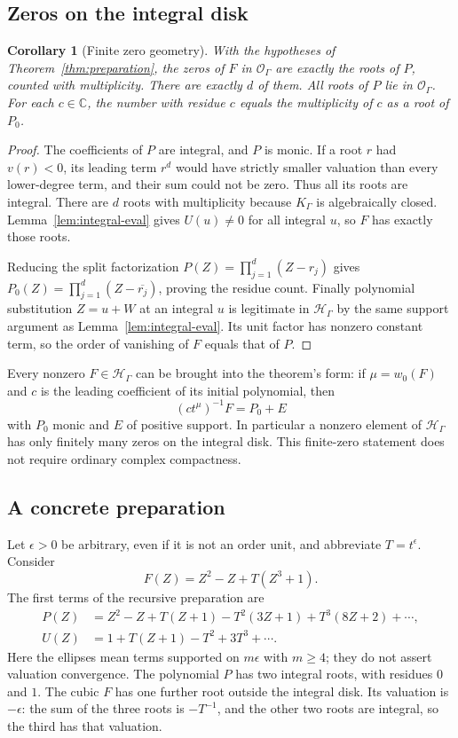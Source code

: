 \documentclass[11pt,letterpaper]{article}
\numberwithin{equation}{section}
\newtheorem{corollary}[theorem]{Corollary}
\theoremstyle{definition}
\theoremstyle{remark}
\newcommand{\C}{\mathbb C}
\newcommand{\red}[1]{\overline{#1}}
\begin{document}
\subsection{Zeros on the integral disk}
\begin{corollary}[Finite zero geometry]\label{cor:prepared-zeros}
With the hypotheses of Theorem~\ref{thm:preparation}, the zeros of $F$ in
$\mathcal O_\Gamma$ are exactly the roots of $P$, counted with multiplicity.
There are exactly $d$ of them. All roots of $P$ lie in $\mathcal O_\Gamma$.
For each $c\in\C$, the number with residue $c$ equals the multiplicity of
$c$ as a root of $P_0$.
\end{corollary}
\begin{proof}
The coefficients of $P$ are integral, and $P$ is monic. If a root $r$ had
$v(r)<0$, its leading term $r^d$ would have strictly smaller valuation than
every lower-degree term, and their sum could not be zero. Thus all its roots
are integral. There are $d$ roots with multiplicity because $K_\Gamma$ is
algebraically closed. Lemma~\ref{lem:integral-eval} gives $U(u)\ne0$ for all
integral $u$, so $F$ has exactly those roots.

Reducing the split factorization
$P(Z)=\prod_{j=1}^d(Z-r_j)$ gives
$P_0(Z)=\prod_{j=1}^d(Z-\red{r_j})$, proving the residue count.
Finally polynomial substitution $Z=u+W$ at an integral $u$ is legitimate in
$\mathcal H_\Gamma$ by the same support argument as
Lemma~\ref{lem:integral-eval}. Its unit factor has nonzero constant term,
so the order of vanishing of $F$ equals that of $P$.
\end{proof}

Every nonzero $F\in\mathcal H_\Gamma$ can be brought into the theorem's form:
if $\mu=w_0(F)$ and $c$ is the leading coefficient of its initial polynomial,
then
\[
 (ct^\mu)^{-1}F=P_0+E
\]
with $P_0$ monic and $E$ of positive support. In particular a nonzero element
of $\mathcal H_\Gamma$ has only finitely many zeros on the integral disk.
This finite-zero statement does not require ordinary complex compactness.

\subsection{A concrete preparation}
Let $\epsilon>0$ be arbitrary, even if it is not an order unit, and abbreviate
$T=t^\epsilon$. Consider
\begin{equation}\label{eq:cubic}
 F(Z)=Z^2-Z+T(Z^3+1).
\end{equation}
The first terms of the recursive preparation are
\begin{align}
 P(Z)&=Z^2-Z+T(Z+1)-T^2(3Z+1)+T^3(8Z+2)+\cdots,
 \label{eq:prep-example-P}\\
 U(Z)&=1+T(Z+1)-T^2+3T^3+\cdots.
 \label{eq:prep-example-U}
\end{align}
Here the ellipses mean terms supported on $m\epsilon$ with $m\ge4$;
they do not assert valuation convergence. The polynomial $P$ has two
integral roots, with residues $0$ and $1$. The cubic $F$ has one further root
outside the integral disk. Its valuation is $-\epsilon$: the sum of the three
roots is $-T^{-1}$, and the other two roots are integral, so the third has
that valuation.
\end{document}
